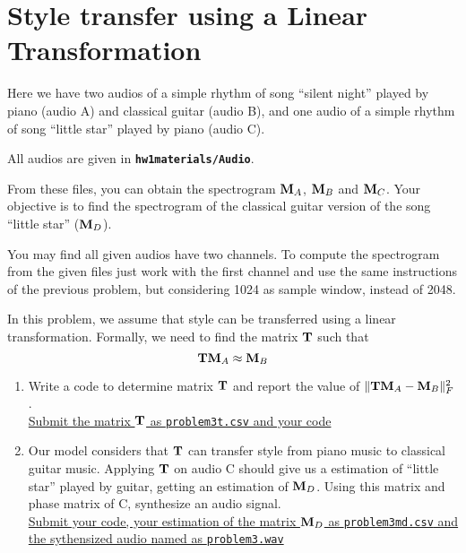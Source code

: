 \section{Style transfer using a Linear Transformation}
Here we have two audios of a simple rhythm of song ``silent night'' played by piano (audio A) and classical guitar (audio B), and one audio of a simple rhythm of song ``little star'' played by piano (audio C). 

All audios are given in \texttt{\textbf{hw1materials/Audio}}.

From these files, you can obtain the spectrogram ${\bf M}_A$, ${\bf M}_B$ and ${\bf M}_C$. Your objective is to find the spectrogram of the classical guitar version of the song ``little star'' (${\bf M}_D$).

You may find all given audios have two channels. To compute the spectrogram from the given files just work with the first channel and use the same instructions of the previous problem, but considering 1024 as sample window, instead of 2048.

In this problem, we assume that style can be transferred using a linear transformation. Formally, we need to find the matrix ${\bf T}$ such that
$$ {\bf T} {\bf M}_A \approx {\bf M}_B$$

\begin{enumerate}
    \item Write a code to determine matrix ${\bf T}$ and report the value of $\| {\bf T} {\bf M}_A - {\bf M}_B \|^2_F$. \\ \ul{Submit the matrix ${\bf T}$ as  \texttt{problem3t.csv}  and your code}
    \item Our model considers that ${\bf T}$ can transfer style from piano music to classical guitar music. Applying ${\bf T}$ on audio C should give us a estimation of ``little star'' played by guitar, getting an estimation of ${\bf M}_D$. Using this matrix and phase matrix of C, synthesize an audio signal. \\
    \ul{Submit your code, your estimation of the matrix ${\bf M}_D$ as \texttt{problem3md.csv} and the sythensized audio named as \texttt{problem3.wav}  }
\end{enumerate}